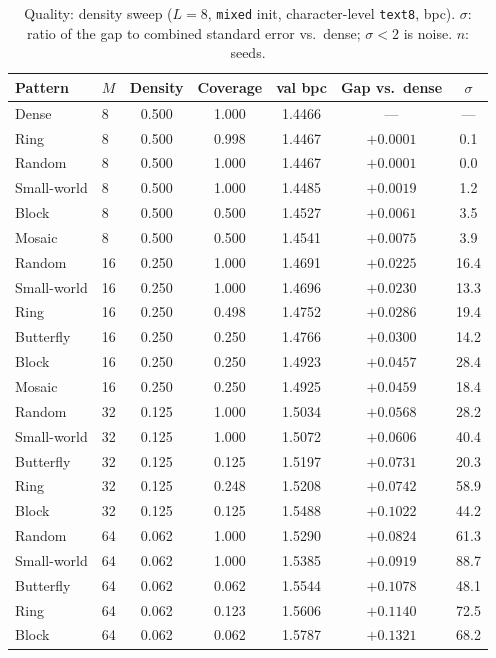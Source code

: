 \documentclass[10pt,journal]{IEEEtran}
\begin{document}
\begin{table}[!t]
\centering
\footnotesize
\caption{Quality: density sweep ($L{=}8$, \texttt{mixed} init, character-level \texttt{text8},
bpc). $\sigma$: ratio of the gap to combined standard error vs.\ dense; $\sigma<2$ is noise.
$n$: seeds.}
\label{tab:quality}
\begin{tabular}{@{}llccccc@{}}
\toprule
Pattern & $M$ & Density & Coverage & val bpc & Gap vs.\ dense & $\sigma$ \\
\midrule
Dense          & 8  & 0.500 & 1.000 & 1.4466 & ---       & ---  \\
Ring           & 8  & 0.500 & 0.998 & 1.4467 & $+0.0001$ & 0.1  \\
Random         & 8  & 0.500 & 1.000 & 1.4467 & $+0.0001$ & 0.0  \\
Small-world    & 8  & 0.500 & 1.000 & 1.4485 & $+0.0019$ & 1.2  \\
Block          & 8  & 0.500 & 0.500 & 1.4527 & $+0.0061$ & 3.5  \\
Mosaic         & 8  & 0.500 & 0.500 & 1.4541 & $+0.0075$ & 3.9  \\
\midrule
Random         & 16 & 0.250 & 1.000 & 1.4691 & $+0.0225$ & 16.4 \\
Small-world    & 16 & 0.250 & 1.000 & 1.4696 & $+0.0230$ & 13.3 \\
Ring           & 16 & 0.250 & 0.498 & 1.4752 & $+0.0286$ & 19.4 \\
Butterfly      & 16 & 0.250 & 0.250 & 1.4766 & $+0.0300$ & 14.2 \\
Block          & 16 & 0.250 & 0.250 & 1.4923 & $+0.0457$ & 28.4 \\
Mosaic         & 16 & 0.250 & 0.250 & 1.4925 & $+0.0459$ & 18.4 \\
\midrule
Random         & 32 & 0.125 & 1.000 & 1.5034 & $+0.0568$ & 28.2 \\
Small-world    & 32 & 0.125 & 1.000 & 1.5072 & $+0.0606$ & 40.4 \\
Butterfly      & 32 & 0.125 & 0.125 & 1.5197 & $+0.0731$ & 20.3 \\
Ring           & 32 & 0.125 & 0.248 & 1.5208 & $+0.0742$ & 58.9 \\
Block          & 32 & 0.125 & 0.125 & 1.5488 & $+0.1022$ & 44.2 \\
\midrule
Random         & 64 & 0.062 & 1.000 & 1.5290 & $+0.0824$ & 61.3 \\
Small-world    & 64 & 0.062 & 1.000 & 1.5385 & $+0.0919$ & 88.7 \\
Butterfly      & 64 & 0.062 & 0.062 & 1.5544 & $+0.1078$ & 48.1 \\
Ring           & 64 & 0.062 & 0.123 & 1.5606 & $+0.1140$ & 72.5 \\
Block          & 64 & 0.062 & 0.062 & 1.5787 & $+0.1321$ & 68.2 \\
\bottomrule
\end{tabular}
\end{table}
\end{document}
